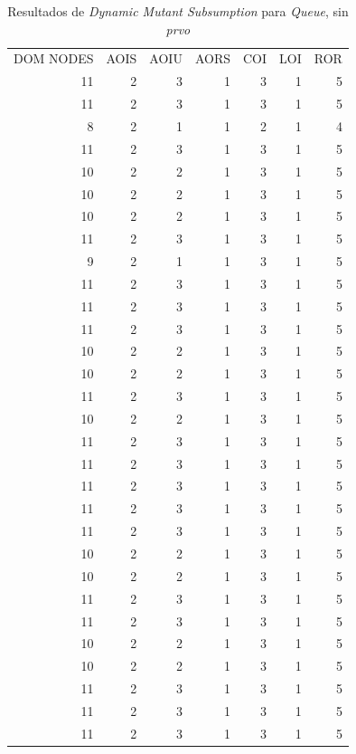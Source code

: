 \begin{table}[]
	\caption{Resultados de \emph{Dynamic Mutant Subsumption} para \emph{Queue}, sin \emph{prvo}}
	\label{tables.results.subsumption.queue.noprvo}
	\centering
	\scriptsize
	\def\arraystretch{0.95}
	\setlength\tabcolsep{0.5mm}
	\begin{tabular}{rrrrrrr}
		DOM NODES & AOIS & AOIU & AORS & COI & LOI & ROR \\
		11 & 2 & 3 & 1 & 3 & 1 & 5 \\
		11 & 2 & 3 & 1 & 3 & 1 & 5 \\
		8 & 2 & 1 & 1 & 2 & 1 & 4 \\
		11 & 2 & 3 & 1 & 3 & 1 & 5 \\
		10 & 2 & 2 & 1 & 3 & 1 & 5 \\
		10 & 2 & 2 & 1 & 3 & 1 & 5 \\
		10 & 2 & 2 & 1 & 3 & 1 & 5 \\
		11 & 2 & 3 & 1 & 3 & 1 & 5 \\
		9 & 2 & 1 & 1 & 3 & 1 & 5 \\
		11 & 2 & 3 & 1 & 3 & 1 & 5 \\
		11 & 2 & 3 & 1 & 3 & 1 & 5 \\
		11 & 2 & 3 & 1 & 3 & 1 & 5 \\
		10 & 2 & 2 & 1 & 3 & 1 & 5 \\
		10 & 2 & 2 & 1 & 3 & 1 & 5 \\
		11 & 2 & 3 & 1 & 3 & 1 & 5 \\
		10 & 2 & 2 & 1 & 3 & 1 & 5 \\
		11 & 2 & 3 & 1 & 3 & 1 & 5 \\
		11 & 2 & 3 & 1 & 3 & 1 & 5 \\
		11 & 2 & 3 & 1 & 3 & 1 & 5 \\
		11 & 2 & 3 & 1 & 3 & 1 & 5 \\
		11 & 2 & 3 & 1 & 3 & 1 & 5 \\
		10 & 2 & 2 & 1 & 3 & 1 & 5 \\
		10 & 2 & 2 & 1 & 3 & 1 & 5 \\
		11 & 2 & 3 & 1 & 3 & 1 & 5 \\
		11 & 2 & 3 & 1 & 3 & 1 & 5 \\
		10 & 2 & 2 & 1 & 3 & 1 & 5 \\
		10 & 2 & 2 & 1 & 3 & 1 & 5 \\
		11 & 2 & 3 & 1 & 3 & 1 & 5 \\
		11 & 2 & 3 & 1 & 3 & 1 & 5 \\
		11 & 2 & 3 & 1 & 3 & 1 & 5
	\end{tabular}
\end{table}

